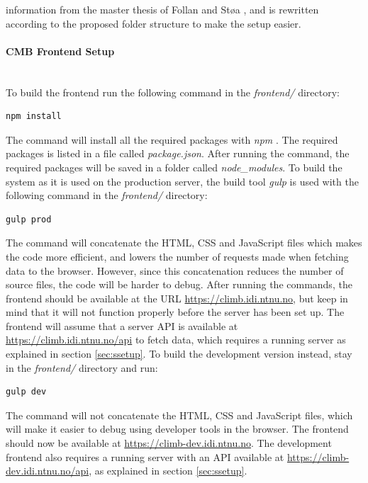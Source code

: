  information from the master thesis of Follan and Støa \cite{mt:T&S}, and is rewritten according to the proposed folder structure to make the setup easier.

\paragraph*{CMB Frontend Setup} \hfill \\
To build the frontend run the following command in the \textit{frontend/} directory:
\begin{lstlisting}[language=sh]
npm install
\end{lstlisting}
The command will install all the required packages with \textit{npm} \cite{m:npm}. The required packages is listed in a file called \textit{package.json}. After running the command, the required packages will be saved in a folder called \textit{node\_modules}. To build the system as it is used on the production server, the build tool \textit{gulp} \cite{m:gulp} is used with the following command in the \textit{frontend/} directory:
\begin{lstlisting}[language=sh]
gulp prod
\end{lstlisting}
The command will concatenate the HTML, CSS and JavaScript files which makes the code more efficient, and lowers the number of requests made when fetching data to the browser. However, since this concatenation reduces the number of source files, the code will be harder to debug. After running the commands, the frontend should be available at the URL \url{https://climb.idi.ntnu.no}, but keep in mind that it will not function properly before the server has been set up. The frontend will assume that a server API is available at \url{https://climb.idi.ntnu.no/api} to fetch data, which requires a running server as explained in section \ref{sec:ssetup}. To build the development version instead, stay in the \textit{frontend/} directory and run:
\begin{lstlisting}[language=sh]
gulp dev
\end{lstlisting}
The command will not concatenate the HTML, CSS and JavaScript files, which will make it easier to debug using developer tools in the browser. The frontend should now be available at \url{https://climb-dev.idi.ntnu.no}. The development frontend also requires a running server with an API available at \url{https://climb-dev.idi.ntnu.no/api}, as explained in section \ref{sec:ssetup}.

